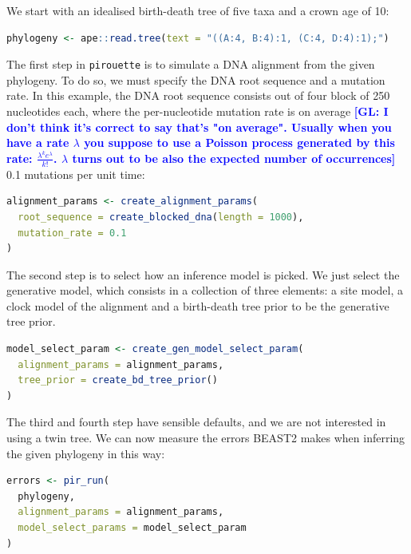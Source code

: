 \documentclass{article}
\newcommand{\giovanni}[1]{\textcolor{blue}{\textbf{[GL: #1]}}}
\begin{document}
We start with an idealised birth-death tree of five taxa and a crown age of 10:

\begin{lstlisting}[language=R, floatplacement=H]
phylogeny <- ape::read.tree(text = "((A:4, B:4):1, (C:4, D:4):1);")
\end{lstlisting}

The first step in \verb;pirouette; is to simulate a DNA alignment from the 
given phylogeny. To do so, we must specify the DNA root sequence
and a mutation rate. In this example, the DNA root sequence consists
out of four block of 250 nucleotides each, where the per-nucleotide
mutation rate is on average \giovanni{I don't think it's correct to say that's "on average". Usually when you have a rate $\lambda$ you suppose to use a Poisson process generated by this rate: $\frac{\lambda^k e^\lambda}{k!}$. $\lambda$ turns out to be also the expected number of occurrences} 0.1 mutations per unit time:

\begin{lstlisting}[language=R, floatplacement=H]
alignment_params <- create_alignment_params(
  root_sequence = create_blocked_dna(length = 1000),
  mutation_rate = 0.1
)
\end{lstlisting}

The second step is to select how an inference model is picked.
We just select the generative model, which consists in a collection of three elements: a site model, a clock
model of the alignment and a birth-death tree prior
to be the generative tree prior.

\begin{lstlisting}[language=R, floatplacement=H]
model_select_param <- create_gen_model_select_param(
  alignment_params = alignment_params,
  tree_prior = create_bd_tree_prior()
)
\end{lstlisting}

The third and fourth step have sensible defaults, and we are not
interested in using a twin tree. We can now measure the errors BEAST2
makes when inferring the given phylogeny in this way:

\begin{lstlisting}[language=R, floatplacement=H]
errors <- pir_run(
  phylogeny,
  alignment_params = alignment_params,
  model_select_params = model_select_param
)
\end{lstlisting}
\end{document}
